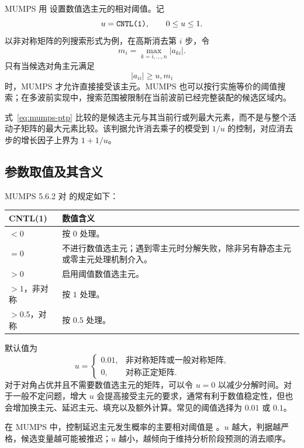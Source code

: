 MUMPS 用  设置数值选主元的相对阈值。记
\[
u=\texttt{CNTL(1)},\qquad 0\le u\le1.
\]
以非对称矩阵的列搜索形式为例，在高斯消去第 $i$ 步，令
\[
m_i=\max_{k=i,\ldots,n}|a_{ki}|.
\]
只有当候选对角主元满足
\begin{equation}
\boxed{|a_{ii}|\ge u,m_i}
\label{eq:mumps-ptp}
\end{equation}
时，MUMPS 才允许直接接受该主元。MUMPS 也可以按行实施等价的阈值搜索；在多波前实现中，搜索范围被限制在当前波前已经完整装配的候选区域内\cite{mumpsguide}。

式~\eqref{eq:mumps-ptp} 比较的是候选主元与其当前行或列最大元素，而不是与整个活动子矩阵的最大元素比较。该判据允许消去乘子的模受到 $1/u$ 的控制，对应消去步的增长因子上界为 $1+1/u$\cite{mumpsguide}。

\subsection{参数取值及其含义}

MUMPS 5.6.2 对  的规定如下：

\begin{center}
\begin{tabularx}{0.92\textwidth}{>{\ttfamily}l X}
\toprule
CNTL(1) & 数值含义 \\
\midrule
$<0$ & 按 $0$ 处理。\\
$=0$ & 不进行数值选主元；遇到零主元时分解失败，除非另有静态主元或零主元处理机制介入。\\
$>0$ & 启用阈值数值选主元。\\
$>1$，非对称 & 按 $1$ 处理。\\
$>0.5$，对称 & 按 $0.5$ 处理。\\
\bottomrule
\end{tabularx}
\end{center}

默认值为
\[
u=
\begin{cases}
0.01, & \text{非对称矩阵或一般对称矩阵},\\
0,    & \text{对称正定矩阵}.
\end{cases}
\]
对于对角占优并且不需要数值选主元的矩阵，可以令 $u=0$ 以减少分解时间。对于一般不定问题，增大 $u$ 会提高接受主元的要求，通常有利于数值稳定性，但也会增加换主元、延迟主元、填充以及额外计算。常见的阈值选择为 $0.01$ 或 $0.1$\cite{mumpsguide}。

\begin{keypoint}
在 MUMPS 中，控制延迟主元发生概率的主要相对阈值是 。$u$ 越大，判据越严格，候选变量越可能被推迟；$u$ 越小，越倾向于维持分析阶段预测的消去顺序。
\end{keypoint}

